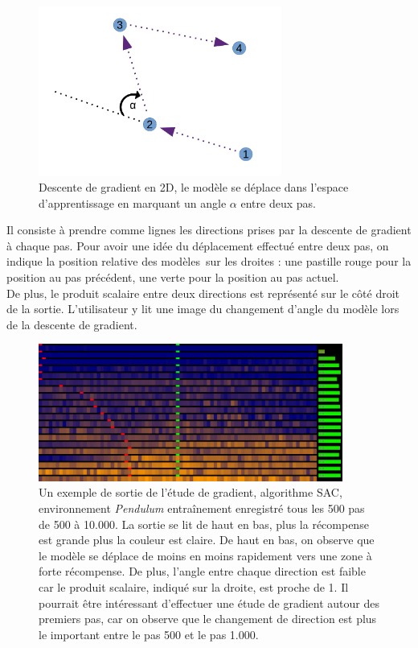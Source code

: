 \documentclass[12pt]{article}
\begin{document}
\begin{figure}[!htp]
    \centering
    \includegraphics[width=8cm]{Images/gradientStudy_dessus}
    \caption{Descente de gradient en 2D, le modèle se déplace dans l'espace d'apprentissage en marquant un angle $\alpha$ entre deux pas.}
    \label{fig:gradientStudyAbove}
\end{figure}

Il consiste à prendre comme lignes les directions prises par la descente de gradient à chaque pas. Pour avoir une idée du déplacement effectué entre deux pas, on indique la position relative des modèles sur les droites : une pastille rouge pour la position au pas précédent, une verte pour la position au pas actuel. \\

De plus, le produit scalaire entre deux directions est représenté sur le côté droit de la sortie. L'utilisateur y lit une image du changement d'angle du modèle lors de la descente de gradient. \\

\begin{figure}[!htp]
    \centering
    \includegraphics[width=10cm]{Images/gradientStudy}
    \caption{Un exemple de sortie de l'étude de gradient, algorithme SAC, environnement \emph{Pendulum} entraînement enregistré tous les 500 pas de 500 à 10.000. La sortie se lit de haut en bas, plus la récompense est grande plus la couleur est claire. De haut en bas, on observe que le modèle se déplace de moins en moins rapidement vers une zone à forte récompense. De plus, l'angle entre chaque direction est faible car le produit scalaire, indiqué sur la droite, est proche de 1. Il pourrait être intéressant d'effectuer une étude de gradient autour des premiers pas, car on observe que le changement de direction est plus le important entre le pas 500 et le pas 1.000.}
    \label{fig:gradientStudy}
\end{figure}
\end{document}
